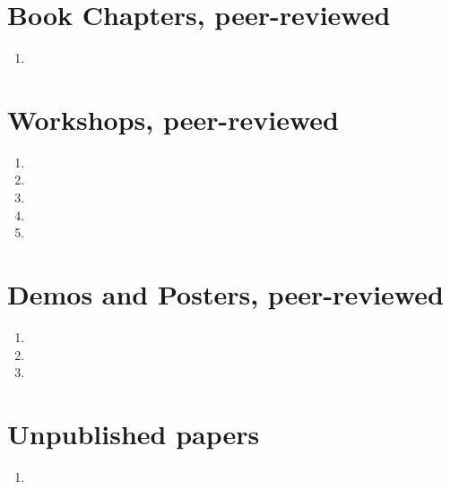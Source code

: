\section*{Book Chapters, peer-reviewed}
\begin{enumerate}[resume]
\item {}
\end{enumerate}


\section*{Workshops, peer-reviewed}
\begin{enumerate}[resume]
    \item {}
    \item {}
    \item {}
    \item {}
    \item {}
\end{enumerate}


\section*{Demos and Posters, peer-reviewed}
\begin{enumerate}[resume]
    \item {}
    \item {}
    \item {}
\end{enumerate}

\section*{Unpublished papers}
\begin{enumerate}[resume]
	\item {}
\end{enumerate}

